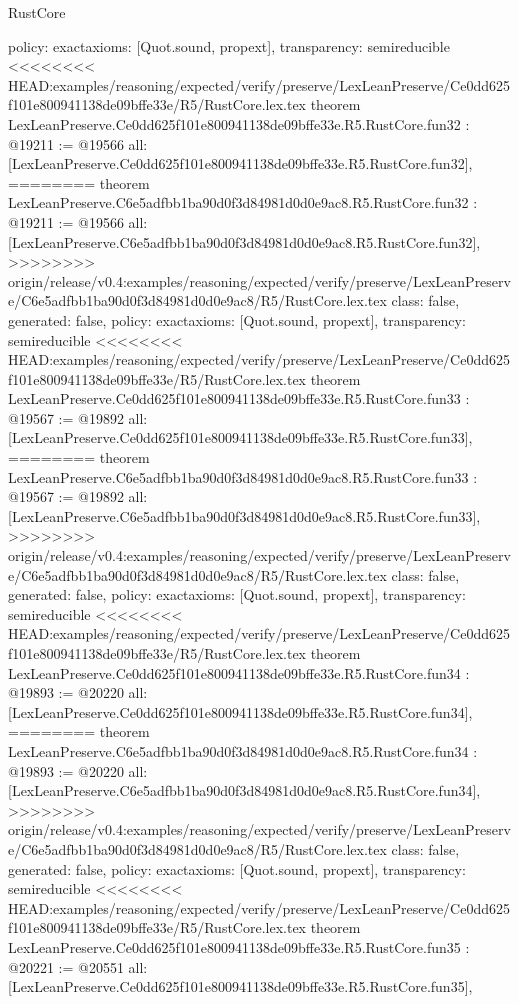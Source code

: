 \begin{lexlean}{RustCore}
\begin{coremodule}
{\begin{coremodule}
{{{{{{{{{{{{{{{{{{{{{{{{{{{{{{{{{{{  policy: exact{axioms: [Quot.sound, propext]},
  transparency: semireducible
}
<<<<<<<< HEAD:examples/reasoning/expected/verify/preserve/LexLeanPreserve/Ce0dd625f101e800941138de09bffe33e/R5/RustCore.lex.tex
theorem LexLeanPreserve.Ce0dd625f101e800941138de09bffe33e.R5.RustCore.fun32 : @19211 := @19566 {
  all: [LexLeanPreserve.Ce0dd625f101e800941138de09bffe33e.R5.RustCore.fun32],
========
theorem LexLeanPreserve.C6e5adfbb1ba90d0f3d84981d0d0e9ac8.R5.RustCore.fun32 : @19211 := @19566 {
  all: [LexLeanPreserve.C6e5adfbb1ba90d0f3d84981d0d0e9ac8.R5.RustCore.fun32],
>>>>>>>> origin/release/v0.4:examples/reasoning/expected/verify/preserve/LexLeanPreserve/C6e5adfbb1ba90d0f3d84981d0d0e9ac8/R5/RustCore.lex.tex
  class: false,
  generated: false,
  policy: exact{axioms: [Quot.sound, propext]},
  transparency: semireducible
}
<<<<<<<< HEAD:examples/reasoning/expected/verify/preserve/LexLeanPreserve/Ce0dd625f101e800941138de09bffe33e/R5/RustCore.lex.tex
theorem LexLeanPreserve.Ce0dd625f101e800941138de09bffe33e.R5.RustCore.fun33 : @19567 := @19892 {
  all: [LexLeanPreserve.Ce0dd625f101e800941138de09bffe33e.R5.RustCore.fun33],
========
theorem LexLeanPreserve.C6e5adfbb1ba90d0f3d84981d0d0e9ac8.R5.RustCore.fun33 : @19567 := @19892 {
  all: [LexLeanPreserve.C6e5adfbb1ba90d0f3d84981d0d0e9ac8.R5.RustCore.fun33],
>>>>>>>> origin/release/v0.4:examples/reasoning/expected/verify/preserve/LexLeanPreserve/C6e5adfbb1ba90d0f3d84981d0d0e9ac8/R5/RustCore.lex.tex
  class: false,
  generated: false,
  policy: exact{axioms: [Quot.sound, propext]},
  transparency: semireducible
}
<<<<<<<< HEAD:examples/reasoning/expected/verify/preserve/LexLeanPreserve/Ce0dd625f101e800941138de09bffe33e/R5/RustCore.lex.tex
theorem LexLeanPreserve.Ce0dd625f101e800941138de09bffe33e.R5.RustCore.fun34 : @19893 := @20220 {
  all: [LexLeanPreserve.Ce0dd625f101e800941138de09bffe33e.R5.RustCore.fun34],
========
theorem LexLeanPreserve.C6e5adfbb1ba90d0f3d84981d0d0e9ac8.R5.RustCore.fun34 : @19893 := @20220 {
  all: [LexLeanPreserve.C6e5adfbb1ba90d0f3d84981d0d0e9ac8.R5.RustCore.fun34],
>>>>>>>> origin/release/v0.4:examples/reasoning/expected/verify/preserve/LexLeanPreserve/C6e5adfbb1ba90d0f3d84981d0d0e9ac8/R5/RustCore.lex.tex
  class: false,
  generated: false,
  policy: exact{axioms: [Quot.sound, propext]},
  transparency: semireducible
}
<<<<<<<< HEAD:examples/reasoning/expected/verify/preserve/LexLeanPreserve/Ce0dd625f101e800941138de09bffe33e/R5/RustCore.lex.tex
theorem LexLeanPreserve.Ce0dd625f101e800941138de09bffe33e.R5.RustCore.fun35 : @20221 := @20551 {
  all: [LexLeanPreserve.Ce0dd625f101e800941138de09bffe33e.R5.RustCore.fun35],
}}}}}}}}}}}}}}}}}}}}}}}}}}}}}}}}}}}}}}
\end{coremodule}}
\end{coremodule}
\end{lexlean}
